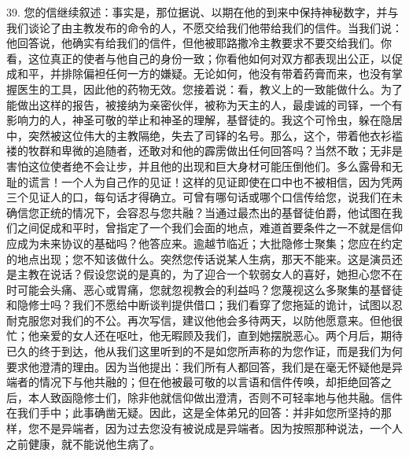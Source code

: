 39. 您的信继续叙述：事实是，那位据说、以期在他的到来中保持神秘数字，并与我们谈论了由主教发布的命令的人，不愿交给我们他带给我们的信件。当我们说：他回答说，他确实有给我们的信件，但他被耶路撒冷主教要求不要交给我们。你看，这位真正的使者与他自己的身份一致；你看他如何对双方都表现出公正，以促成和平，并排除偏袒任何一方的嫌疑。无论如何，他没有带着药膏而来，也没有掌握医生的工具，因此他的药物无效。您接着说：看，教义上的一致能做什么。为了能做出这样的报告，被接纳为亲密伙伴，被称为天主的人，最虔诚的司铎，一个有影响力的人，神圣可敬的举止和神圣的理解，基督徒的。我这个可怜虫，躲在隐居中，突然被这位伟大的主教隔绝，失去了司铎的名号。那么，这个，带着他衣衫褴褛的牧群和卑微的追随者，还敢对和他的霹雳做出任何回答吗？当然不敢；无非是害怕这位使者绝不会让步，并且他的出现和巨大身材可能压倒他们。多么露骨和无耻的谎言！一个人为自己作的见证！这样的见证即使在口中也不被相信，因为凭两三个见证人的口，每句话才得确立。可曾有哪句话或哪个口信传给您，说我们在未确信您正统的情况下，会容忍与您共融？当通过最杰出的基督徒伯爵，他试图在我们之间促成和平时，曾指定了一个我们会面的地点，难道首要条件之一不就是信仰应成为未来协议的基础吗？他答应来。逾越节临近；大批隐修士聚集；您应在约定的地点出现；您不知该做什么。突然您传话说某人生病，那天不能来。这是演员还是主教在说话？假设您说的是真的，为了迎合一个软弱女人的喜好，她担心您不在时可能会头痛、恶心或胃痛，您就忽视教会的利益吗？您蔑视这么多聚集的基督徒和隐修士吗？我们不愿给中断谈判提供借口；我们看穿了您拖延的诡计，试图以忍耐克服您对我们的不公。再次写信，建议他他会多待两天，以防他愿意来。但他很忙；他亲爱的女人还在呕吐，他无暇顾及我们，直到她摆脱恶心。两个月后，期待已久的终于到达，他从我们这里听到的不是如您所声称的为您作证，而是我们为何要求他澄清的理由。因为当他提出：我们所有人都回答，我们是在毫无怀疑他是异端者的情况下与他共融的；但在他被最可敬的以言语和信件传唤，却拒绝回答之后，本人致函隐修士们，除非他就信仰做出澄清，否则不可轻率地与他共融。信件在我们手中；此事确凿无疑。因此，这是全体弟兄的回答：并非如您所坚持的那样，您不是异端者，因为过去您没有被说成是异端者。因为按照那种说法，一个人之前健康，就不能说他生病了。\par

